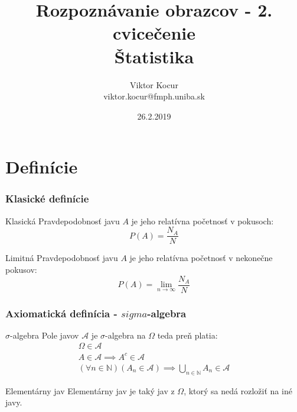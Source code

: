 \documentclass{beamer}
\title[Štatistika]{Rozpoznávanie obrazcov - 2. cvicečenie \\ Štatistika}
\author[Viktor Kocur]{Viktor Kocur \\{\small viktor.kocur@fmph.uniba.sk}}
\institute{DAI FMFI UK}
\date{26.2.2019}
\begin{document}

\begin{frame}[plain]
  \titlepage  
\end{frame}

\section{Definície}

\begin{frame}
\frametitle{Klasické definície}

\begin{block}{Klasická}
Pravdepodobnosť javu $A$ je jeho relatívna početnosť v pokusoch:
\begin{equation*}
P(A) = \frac{N_A}{N}
\end{equation*}
\end{block}

\begin{block}{Limitná}
Pravdepodobnosť javu $A$ je jeho relatívna početnosť v nekonečne pokusov:
\begin{equation*}
P(A) = \lim_{n\to\infty} \frac{N_A}{N}
\end{equation*}
\end{block}
\end{frame}

\begin{frame}
\frametitle{Axiomatická definícia - $sigma$-algebra}

\begin{block}{$\sigma$-algebra}
Pole javov $\mathcal{A}$ je $\sigma$-algebra na $\Omega$ teda preň platia:
\begin{gather}
\Omega \in \mathcal{A} \\
A \in \mathcal{A} \implies A^{c} \in \mathcal{A} \\
(\forall n \in \mathbb{N}) (A_n \in \mathcal{A}) \implies \bigcup_{n \in \mathbb{N}} A_n \in \mathcal{A}
\end{gather}
\end{block}

\begin{block}{Elementárny jav}
Elementárny jav je taký jav z $\Omega$, ktorý sa nedá rozložiť na iné javy.
\end{block}
\end{frame}
\end{document}
